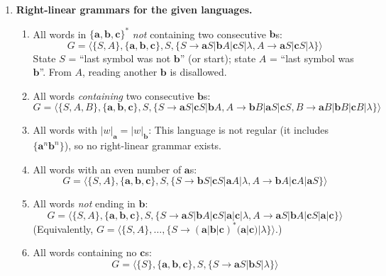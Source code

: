 \begin{enumerate}[{8.}1. ]
\begin{enumerate}
\item For $G_7$: States $\{S, B, C\}$, with implicit final state $f$. Transitions: $S \xrightarrow{\pmb{a}} S$, $S \xrightarrow{\pmb{ab}} B$, $S \xrightarrow{\pmb{c}} C$, $B \xrightarrow{\pmb{ab}} B$, $B \xrightarrow{\lambda} f$, $C \xrightarrow{\pmb{c}} C$, $C \xrightarrow{\pmb{ca}} f$.
\end{enumerate}

\item \textbf{Right-linear grammars for the given languages.}

\begin{enumerate}
\item All words in $\{\pmb{a},\pmb{b},\pmb{c}\}^*$ \emph{not} containing two consecutive $\pmb{b}$s:
\[
G = \langle\{S,A\},\{\pmb{a},\pmb{b},\pmb{c}\},S,\{S\to\pmb{a}S|\pmb{b}A|\pmb{c}S|\lambda,
A\to\pmb{a}S|\pmb{c}S|\lambda\}\rangle
\]
State $S$ = ``last symbol was not $\pmb{b}$'' (or start); state $A$ = ``last symbol was $\pmb{b}$''. From $A$, reading another $\pmb{b}$ is disallowed.

\item All words \emph{containing} two consecutive $\pmb{b}$s:
\[
G = \langle\{S,A,B\},\{\pmb{a},\pmb{b},\pmb{c}\},S,\{S\to\pmb{a}S|\pmb{c}S|\pmb{b}A,
A\to\pmb{b}B|{\pmb{a}S|\pmb{c}S},B\to\pmb{a}B|\pmb{b}B|\pmb{c}B|\lambda\}\rangle
\]

\item All words with $|w|_{\pmb{a}} = |w|_{\pmb{b}}$: This language is not regular (it includes $\{\pmb{a}^n\pmb{b}^n\}$), so no right-linear grammar exists.

\item All words with an even number of $\pmb{a}$s:
\[
G = \langle\{S,A\},\{\pmb{a},\pmb{b},\pmb{c}\},S,\{S\to\pmb{b}S|\pmb{c}S|\pmb{a}A|\lambda,
A\to\pmb{b}A|\pmb{c}A|\pmb{a}S\}\rangle
\]

\item All words \emph{not} ending in $\pmb{b}$:
\[
G = \langle\{S,A\},\{\pmb{a},\pmb{b},\pmb{c}\},S,\{S\to\pmb{a}S|\pmb{b}A|\pmb{c}S|\pmb{a}|\pmb{c}|\lambda,
A\to\pmb{a}S|\pmb{b}A|\pmb{c}S|\pmb{a}|\pmb{c}\}\rangle
\]
(Equivalently, $G = \langle\{S,A\},\ldots,\{S\to(\pmb{a}|\pmb{b}|\pmb{c})^*(\pmb{a}|\pmb{c})|\lambda\}\rangle$.)

\item All words containing no $\pmb{c}$s:
\[
G = \langle\{S\},\{\pmb{a},\pmb{b},\pmb{c}\},S,\{S\to\pmb{a}S|\pmb{b}S|\lambda\}\rangle
\]
\end{enumerate}


\end{enumerate}
